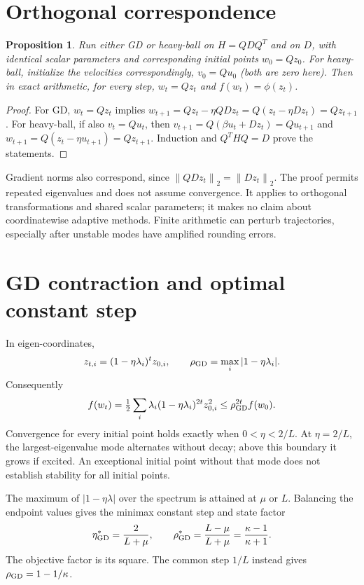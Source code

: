 \documentclass[11pt,a4paper]{article}
\newtheorem{proposition}{Proposition}
\newcommand{\norm}[1]{\left\lVert#1\right\rVert}
\begin{document}
\section{Orthogonal correspondence}
\begin{proposition}
Run either GD or heavy-ball on $H=QDQ^T$ and on $D$, with identical scalar
parameters and corresponding initial points $w_0=Qz_0$. For heavy-ball, initialize
the velocities correspondingly, $v_0=Qu_0$ (both are zero here). Then in exact
arithmetic, for every step, $w_t=Qz_t$ and $f(w_t)=\phi(z_t)$.
\end{proposition}
\begin{proof}
For GD, $w_t=Qz_t$ implies
$w_{t+1}=Qz_t-\eta QDz_t=Q(z_t-\eta Dz_t)=Qz_{t+1}$.
For heavy-ball, if also $v_t=Qu_t$, then
$v_{t+1}=Q(\beta u_t+Dz_t)=Qu_{t+1}$ and
$w_{t+1}=Q(z_t-\eta u_{t+1})=Qz_{t+1}$.
Induction and $Q^THQ=D$ prove the statements.
\end{proof}
Gradient norms also correspond, since $\norm{QDz_t}_2=\norm{Dz_t}_2$.
The proof permits repeated eigenvalues and does not assume convergence. It
applies to orthogonal transformations and shared scalar parameters; it makes
no claim about coordinatewise adaptive methods. Finite arithmetic can perturb
trajectories, especially after unstable modes have amplified rounding errors.

\section{GD contraction and optimal constant step}
In eigen-coordinates,
\[
 z_{t,i}=(1-\eta\lambda_i)^t z_{0,i},\qquad
 \rho_{\rm GD}=\max_i|1-\eta\lambda_i|.
\]
Consequently
\begin{equation}
 f(w_t)=\tfrac12\sum_i\lambda_i(1-\eta\lambda_i)^{2t}z_{0,i}^2
 \le\rho_{\rm GD}^{2t} f(w_0).
 \label{eq:gd-bound}
\end{equation}
Convergence for every initial point holds exactly when $0<\eta<2/L$.
At $\eta=2/L$, the largest-eigenvalue mode alternates without decay; above
this boundary it grows if excited. An exceptional initial point without that
mode does not establish stability for all initial points.

The maximum of $|1-\eta\lambda|$ over the spectrum is attained at $\mu$ or $L$.
Balancing the endpoint values gives the minimax constant step and state factor
\[
 \eta^*_{\rm GD}=\frac2{L+\mu},\qquad
 \rho^*_{\rm GD}=\frac{L-\mu}{L+\mu}=\frac{\kappa-1}{\kappa+1}.
\]
The objective factor is its square. The common step $1/L$ instead gives
$\rho_{\rm GD}=1-1/\kappa$.
\end{document}
